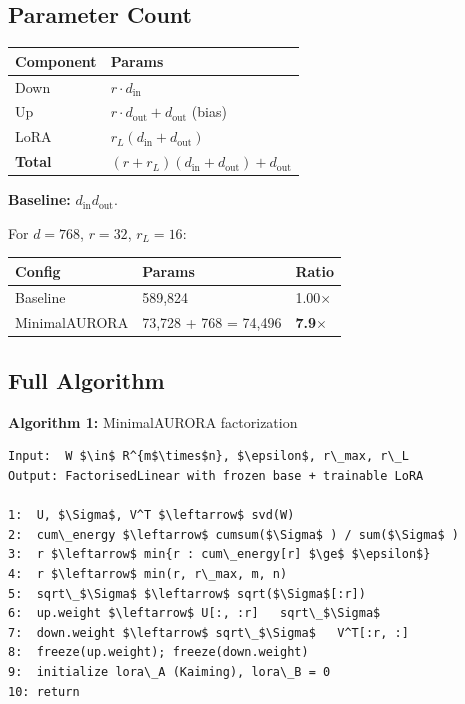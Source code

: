 \subsection{Parameter Count}

\begin{table}[H]
\centering
\small
\begin{tabular}{ll}
\toprule
\textbf{Component} & \textbf{Params} \\
\midrule
Down & $r \cdot d_\text{in}$ \\
Up & $r \cdot d_\text{out} + d_\text{out}$ (bias) \\
LoRA & $r_L(d_\text{in} + d_\text{out})$ \\
\textbf{Total} & $(r + r_L)(d_\text{in} + d_\text{out}) + d_\text{out}$ \\
\bottomrule
\end{tabular}
\end{table}

\textbf{Baseline:} $d_\text{in} d_\text{out}$.

For $d = 768$, $r = 32$, $r_L = 16$:

\begin{table}[H]
\centering
\small
\begin{tabular}{lll}
\toprule
\textbf{Config} & \textbf{Params} & \textbf{Ratio} \\
\midrule
Baseline & 589,824 & 1.00$\times$ \\
MinimalAURORA & 73,728 + 768 = 74,496 & \textbf{7.9$\times$} \\
\bottomrule
\end{tabular}
\end{table}

\subsection{Full Algorithm}

\textbf{Algorithm 1:} MinimalAURORA factorization
\begin{lstlisting}
Input:  W $\in$ R^{m$\times$n}, $\epsilon$, r\_max, r\_L
Output: FactorisedLinear with frozen base + trainable LoRA

1:  U, $\Sigma$, V^T $\leftarrow$ svd(W)
2:  cum\_energy $\leftarrow$ cumsum($\Sigma$ ) / sum($\Sigma$ )
3:  r $\leftarrow$ min{r : cum\_energy[r] $\ge$ $\epsilon$}
4:  r $\leftarrow$ min(r, r\_max, m, n)
5:  sqrt\_$\Sigma$ $\leftarrow$ sqrt($\Sigma$[:r])
6:  up.weight $\leftarrow$ U[:, :r]   sqrt\_$\Sigma$
7:  down.weight $\leftarrow$ sqrt\_$\Sigma$   V^T[:r, :]
8:  freeze(up.weight); freeze(down.weight)
9:  initialize lora\_A (Kaiming), lora\_B = 0
10: return
\end{lstlisting}

